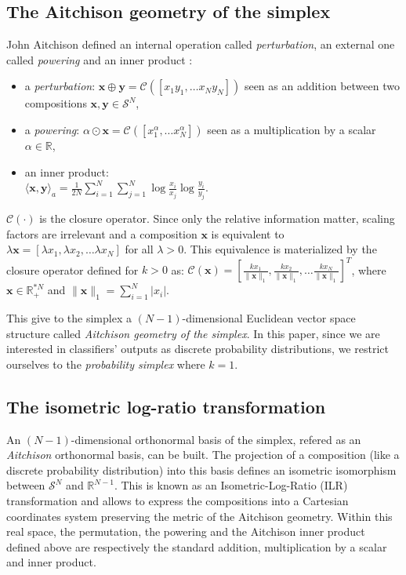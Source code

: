 \documentclass{article}
\theoremstyle{plain}
\theoremstyle{definition}
\theoremstyle{remark}
\begin{document}
\subsection{The Aitchison geometry of the simplex}
John Aitchison defined an internal operation called \emph{perturbation}, an external one called \emph{powering} and an inner product \cite{aitchison2001}:
\begin{itemize}
\item a \emph{perturbation}:
  $\bm{x}\oplus \bm{y} = \mathcal{C}\left([x_1y_1,\dots x_{N}y_{N}]\right)$ seen as an addition between two compositions $\bm{x},\bm{y}\in \mathcal{S}^N$,
\item a \emph{powering}:
  $\alpha \odot \bm{x} = \mathcal{C}\left([x_{1}^{\alpha},\dots x_{N}^{\alpha}]\right)$ seen as a multiplication by a scalar $\alpha \in \mathbb{R}$,
\item an inner product:\\
  $\displaystyle \langle \bm{x},\bm{y} \rangle_a = \frac{1}{2N}\sum_{i=1}^{N} \sum_{j=1}^{N} \log \frac{x_i}{x_j}\log \frac{y_i}{y_j}$.
\end{itemize}
$\mathcal{C}(\cdot)$ is the closure operator. Since only the relative information matter, scaling factors are irrelevant and a composition $\bm{x}$ is equivalent to $\lambda \bm{x} = [\lambda x_1,\lambda x_2,\dots\lambda x_N]$ for all $\lambda>0$. This equivalence is materialized by the closure operator defined for $k>0$ as: $\mathcal{C}\left(\bm{x} \right) = \left[ \frac{k x_1}{\lVert \bm{x} \rVert_1}, \frac{k x_2}{\lVert \bm{x} \rVert_1} ,\dots \frac{k x_N}{\lVert \bm{x} \rVert_1} \right]^T$, where $\bm{x} \in \mathbb{R}_+^{*N}$ and $\displaystyle \lVert \bm{x} \rVert_1 = \sum_{i=1}^N \lvert x_i \rvert$.%

This give to the simplex a $(N-1)$-dimensional Euclidean vector space structure called \emph{Aitchison geometry of the simplex}. In this paper, since we are interested in classifiers' outputs as discrete probability distributions, we restrict ourselves to the \emph{probability simplex} where $k=1$.

\subsection{The isometric log-ratio transformation}
\label{sec:ilr}

An $(N-1)$-dimensional orthonormal basis of the simplex, refered as an \emph{Aitchison} orthonormal basis, can be built. The projection of a composition (like a discrete probability distribution) into this basis defines an isometric isomorphism between $\mathcal{S}^N$ and $\mathbb{R}^{N-1}$. This is known as an Isometric-Log-Ratio (ILR) transformation \cite{egozcue2003isometric} and allows to express the compositions into a Cartesian coordinates system preserving the metric of the Aitchison geometry. Within this real space, the permutation, the powering and the Aitchison inner product defined above are respectively the standard addition, multiplication by a scalar and inner product.
\end{document}
